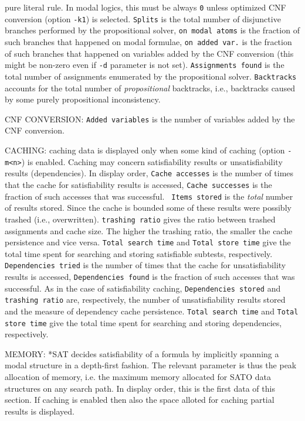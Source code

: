 \documentclass[12pt]{report}
\begin{document}
\begin{description}
pure literal rule. In modal logics, this must be always {\tt 0} unless
optimized CNF conversion (option {\tt -k1}) is selected. {\tt Splits}
is the total number of disjunctive branches performed by the propositional
solver, {\tt on modal atoms} is the fraction of such branches that
happened on modal formulae, {\tt on added var.} is the fraction of
such branches that happened on variables added by the CNF conversion
(this might be non-zero even if {\tt -d} parameter is not set).
{\tt Assignments found} is the total number of assignments enumerated
by the propositional solver. {\tt Backtracks} accounts for the total
number of \textit{propositional} backtracks, i.e., backtracks caused
by some purely propositional inconsistency.
\item{CNF CONVERSION:} {\tt Added variables} is the number of
variables added by the CNF conversion.
\item{CACHING:} caching data is displayed only when some kind of
caching (option {\tt -m<n>}) is enabled. Caching may concern
satisfiability results or unsatisfiability results (dependencies).
In display order, {\tt Cache accesses} is the number of times that the
cache for satisfiability results is accessed, {\tt Cache
successes} is the fraction of such accesses that was successful. {\tt
Items stored} is the \textit{total} number of results stored. Since
the cache is bounded some of these results were possibly trashed
(i.e., overwritten). {\tt trashing ratio} gives the ratio between
trashed assignments and cache size. The higher the trashing ratio, the
smaller the cache persistence and vice versa. {\tt Total search time}
and {\tt Total store time} give the total time spent for searching and
storing satisfiable subtests, respectively. {\tt Dependencies tried}
is the number of times that the cache for unsatisfiability results is
accessed, {\tt Dependencies found} is the fraction of such accesses
that was successful. 
As in the case of
satisfiability caching, {\tt Dependencies stored} and {\tt trashing
ratio} are, respectively,  the number of unsatisfiability results
stored and the measure of dependency cache persistence.
{\tt Total search time}
and {\tt Total store time} give the total time spent for searching and
storing dependencies, respectively.
\item{MEMORY:} *SAT decides satisfiability of a formula by implicitly
spanning a modal structure in a depth-first fashion. The relevant
parameter is thus the peak allocation of memory, i.e. the maximum
memory allocated for SATO data structures on any search path. In
display order, this is the first data of this section. If caching is
enabled then also the space alloted for caching partial results is
displayed.
\end{description}



\end{document}
